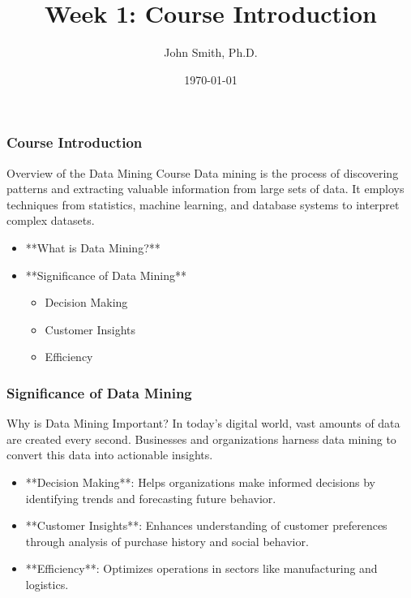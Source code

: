 \documentclass[aspectratio=169]{beamer}
\title[Data Mining Introduction]{Week 1: Course Introduction}
\author[J. Smith]{John Smith, Ph.D.}
\institute[University Name]{
  Department of Computer Science\\
  University Name\\
  \vspace{0.3cm}
  Email: email@university.edu\\
  Website: www.university.edu
}
\date{\today}
\begin{document}
\frame{\titlepage}

\begin{frame}[fragile]
    \frametitle{Course Introduction}
    \begin{block}{Overview of the Data Mining Course}
        Data mining is the process of discovering patterns and extracting valuable information from large sets of data. It employs techniques from statistics, machine learning, and database systems to interpret complex datasets.
    \end{block}
    
    \begin{itemize}
        \item **What is Data Mining?**
        \item **Significance of Data Mining**
        \begin{itemize}
            \item Decision Making
            \item Customer Insights
            \item Efficiency
        \end{itemize}
    \end{itemize}
\end{frame}

\begin{frame}[fragile]
    \frametitle{Significance of Data Mining}
    \begin{block}{Why is Data Mining Important?}
        In today's digital world, vast amounts of data are created every second. Businesses and organizations harness data mining to convert this data into actionable insights.
    \end{block}
    
    \begin{itemize}
        \item **Decision Making**: Helps organizations make informed decisions by identifying trends and forecasting future behavior.
        \item **Customer Insights**: Enhances understanding of customer preferences through analysis of purchase history and social behavior.
        \item **Efficiency**: Optimizes operations in sectors like manufacturing and logistics.
    \end{itemize}
\end{frame}
\end{document}
